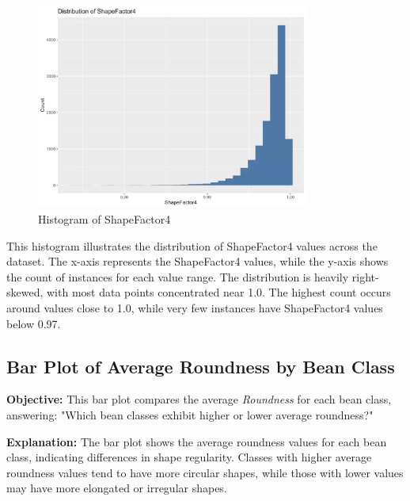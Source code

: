 \documentclass[a4paper,12pt]{article}
\begin{document}
\begin{figure}[H]
    \centering
    \includegraphics[width=0.8\textwidth]{graphs/histogram_shapefactor4.png}
    \caption{Histogram of ShapeFactor4}
    \label{fig:histogram_shapefactor4}
\end{figure}
This histogram illustrates the distribution of ShapeFactor4 values across the dataset. The x-axis represents the ShapeFactor4 values, while the y-axis shows the count of instances for each value range. The distribution is heavily right-skewed, with most data points concentrated near 1.0. The highest count occurs around values close to 1.0, while very few instances have ShapeFactor4 values below 0.97.

\newpage

\subsection{Bar Plot of Average Roundness by Bean Class}
\noindent\textbf{Objective:} This bar plot compares the average \textit{Roundness} for each bean class, answering: "Which bean classes exhibit higher or lower average roundness?"

\noindent\textbf{Explanation:} The bar plot shows the average roundness values for each bean class, indicating differences in shape regularity. Classes with higher average roundness values tend to have more circular shapes, while those with lower values may have more elongated or irregular shapes.
\end{document}
